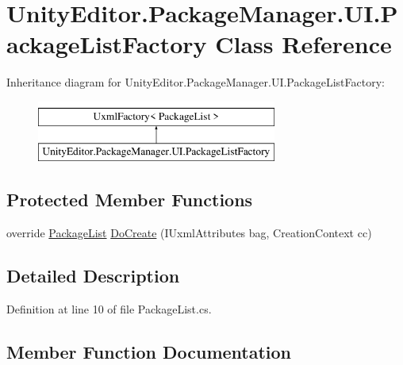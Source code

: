 \hypertarget{class_unity_editor_1_1_package_manager_1_1_u_i_1_1_package_list_factory}{}\section{Unity\+Editor.\+Package\+Manager.\+U\+I.\+Package\+List\+Factory Class Reference}
\label{class_unity_editor_1_1_package_manager_1_1_u_i_1_1_package_list_factory}
Inheritance diagram for Unity\+Editor.\+Package\+Manager.\+U\+I.\+Package\+List\+Factory\+:\begin{figure}[H]
\begin{center}
\leavevmode
\includegraphics[height=2.000000cm]{class_unity_editor_1_1_package_manager_1_1_u_i_1_1_package_list_factory}
\end{center}
\end{figure}
\subsection*{Protected Member Functions}
\begin{DoxyCompactItemize}
\item 
override \mbox{\hyperlink{class_unity_editor_1_1_package_manager_1_1_u_i_1_1_package_list}{Package\+List}} \mbox{\hyperlink{class_unity_editor_1_1_package_manager_1_1_u_i_1_1_package_list_factory_a71208cac3c3bbd8a68dcda8168ea4036}{Do\+Create}} (I\+Uxml\+Attributes bag, Creation\+Context cc)
\end{DoxyCompactItemize}


\subsection{Detailed Description}


Definition at line 10 of file Package\+List.\+cs.



\subsection{Member Function Documentation}
\mbox{\label{class_unity_editor_1_1_package_manager_1_1_u_i_1_1_package_list_factory_a71208cac3c3bbd8a68dcda8168ea4036}} 
